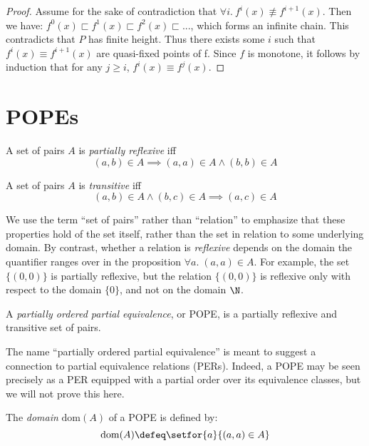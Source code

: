 \documentclass{article}
\newcommand{\alt}{\sqsubset}
\newcommand{\dom}[1]{\mathrm{dom}(#1)}
\begin{document}
\begin{proof}
  Assume for the sake of contradiction that $\forall i.\ f^i(x) \not\equiv
  f^{i+1}(x)$. Then we have: \( f^0(x) \alt f^1(x) \alt f^2(x) \alt ... \),
  which forms an infinite chain. This contradicts that $P$ has finite height.
  Thus there exists some $i$ such that $f^i(x) \equiv f^{i+1}(x)$ are
  quasi-fixed points of f. Since $f$ is monotone, it follows by induction that
  for any $j \ge i$, $f^i(x) \equiv f^j(x)$.
\end{proof}


\section{POPEs}

\begin{definition}
  A set of pairs $A$ is \emph{partially reflexive} iff
  \[ (a,b) \in A \implies (a,a) \in A \wedge (b,b) \in A \]
\end{definition}

\begin{definition}
  A set of pairs $A$ is \emph{transitive} iff
  \[ (a,b) \in A \wedge (b,c) \in A \implies (a,c) \in A\]
\end{definition}

We use the term ``set of pairs'' rather than ``relation'' to emphasize that
these properties hold of the set itself, rather than the set in relation to some
underlying domain. By contrast, whether a relation is \emph{reflexive} depends
on the domain the quantifier ranges over in the proposition $\forall a.\; (a,a)
\in A$. For example, the set $\{(0,0)\}$ is partially reflexive, but the
relation $\{(0,0)\}$ is reflexive only with respect to the domain $\{0\}$, and
not on the domain $\N$.

\begin{definition}
  A \emph{partially ordered partial equivalence}, or POPE, is a partially
  reflexive and transitive set of pairs.
\end{definition}

The name ``partially ordered partial equivalence'' is meant to suggest a
connection to partial equivalence relations (PERs). Indeed, a POPE may be seen
precisely as a PER equipped with a partial order over its equivalence classes,
but we will not prove this here.

\begin{definition}
  The \emph{domain} $\dom{A}$ of a POPE is defined by:
  \begin{equation*}
    \dom{A} \defeq \setfor{a}{(a,a) \in A}
  \end{equation*}
\end{definition}
\end{document}
